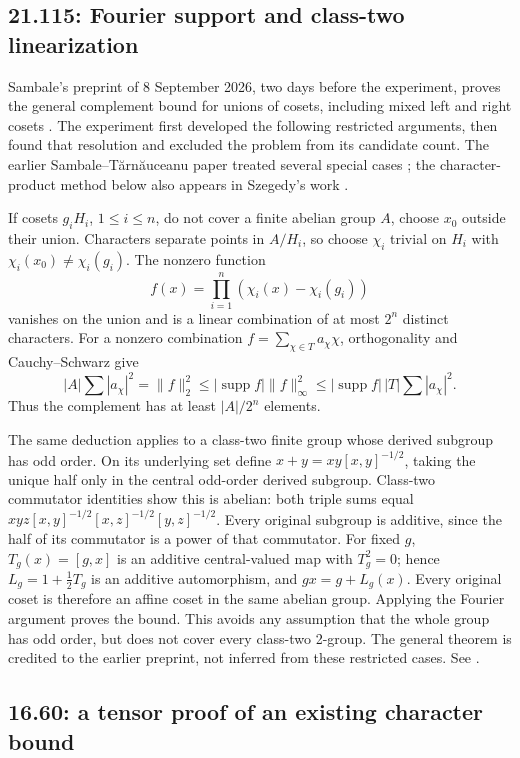 \subsection{21.115: Fourier support and class-two linearization}
\label{prior:21.115}

Sambale's preprint of 8 September 2026, two days before the
experiment, proves the general complement bound for unions
of cosets, including mixed left and right cosets
\cite{sambale-cosets}. The experiment first developed the
following restricted arguments, then found that resolution
and excluded the problem from its candidate count.
The earlier Sambale--T\u arn\u auceanu paper treated several
special cases \cite{sambale-tarnauceanu}; the character-product
method below also appears in Szegedy's work \cite{szegedy}.

If cosets \(g_iH_i\), \(1\le i\le n\), do not cover a finite
abelian group \(A\), choose \(x_0\) outside their union.
Characters separate points in \(A/H_i\), so choose \(\chi_i\)
trivial on \(H_i\) with \(\chi_i(x_0)\ne\chi_i(g_i)\).
The nonzero function
\[
 f(x)=\prod_{i=1}^n(\chi_i(x)-\chi_i(g_i))
\]
vanishes on the union and is a linear combination of at most
\(2^n\) distinct characters. For a nonzero combination
\(f=\sum_{\chi\in T}a_\chi\chi\), orthogonality and
Cauchy--Schwarz give
\[
 |A|\sum|a_\chi|^2=\|f\|_2^2
 \le|\operatorname{supp}f|\|f\|_\infty^2
 \le|\operatorname{supp}f|\,|T|\sum|a_\chi|^2.
\]
Thus the complement has at least \(|A|/2^n\) elements.

The same deduction applies to a class-two finite group
whose derived subgroup has odd order. On its underlying
set define \(x+y=xy[x,y]^{-1/2}\), taking the unique half
only in the central odd-order derived subgroup.
Class-two commutator identities show this is abelian:
both triple sums equal
\(xyz[x,y]^{-1/2}[x,z]^{-1/2}[y,z]^{-1/2}\).
Every original subgroup is additive, since the half of
its commutator is a power of that commutator.
For fixed \(g\), \(T_g(x)=[g,x]\) is an additive central-valued
map with \(T_g^2=0\); hence \(L_g=1+\frac12T_g\) is an
additive automorphism, and \(gx=g+L_g(x)\).
Every original coset is therefore an affine coset in the
same abelian group. Applying the Fourier argument proves
the bound. This avoids any assumption that the whole
group has odd order, but does not cover every class-two
2-group. The general theorem is credited to the earlier
preprint, not inferred from these restricted cases.
See .

\subsection{16.60: a tensor proof of an existing character bound}
\label{prior:16.60}

